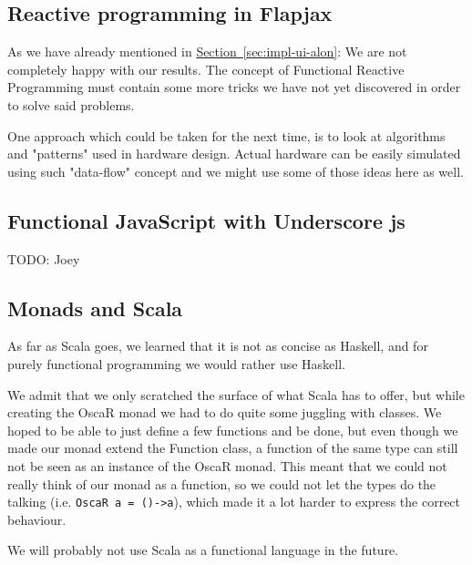 \documentclass[a4paper]{article}
\begin{document}
\subsection{Reactive programming in Flapjax}
As we have already mentioned in 
\hyperref[sec:impl-ui-alon]{Section~\ref*{sec:impl-ui-alon}}:
We are not completely happy with our results.
The concept of Functional Reactive Programming must contain some more tricks we
have not yet discovered in order to solve said problems. 

One approach which could
be taken for the next time, is to look at algorithms and "patterns" used in hardware
design. Actual hardware can be easily simulated using such "data-flow" concept
and we might use some of those ideas here as well.

\subsection{Functional JavaScript with Underscore js}
{\Large TODO:} Joey

\subsection{Monads and Scala}
As far as Scala goes, 
we learned that it is not as concise as Haskell,
and for purely functional programming we would rather use Haskell.

We admit that we only scratched the surface of what Scala has to offer,
but while creating the OscaR monad we had to do quite some juggling with classes.
We hoped to be able to just define a few functions and be done, 
but even though we made our monad extend the Function class,
a function of the same type can still not be seen as an instance of the OscaR monad.
This meant that we could not really think of our monad as a function,
so we could not let the types do the talking (i.e. \verb|OscaR a = ()->a|),
which made it a lot harder to express the correct behaviour.

We will probably not use Scala as a functional language in the future.

\printbibliography
\end{document}
